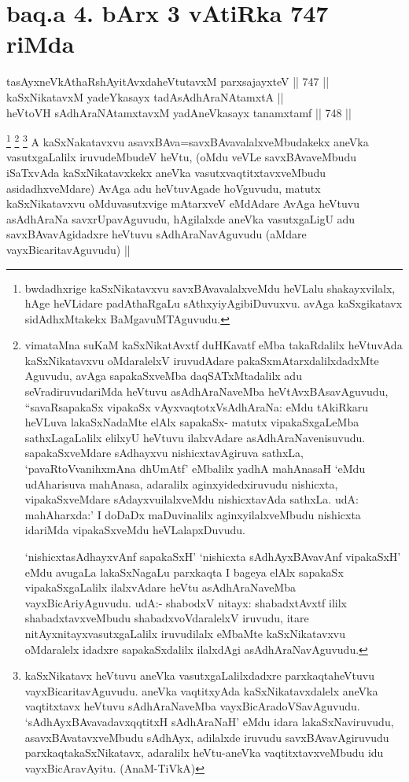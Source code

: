 \section*{baq.a 4. bArx 3 vAtiRka 747 riMda}

\begin{shl}
tasAyxneVkAthaRshAyitAvxdaheVtutavxM parxsajayxteV ||  747 || \\
kaSxNikatavxM yadeYkasayx tadA\s sAdhAraNAtamxtA || \\
heVtoVH sAdhAraNAtamxtavxM yadA\s neVkasayx tanamxtamf ||  748 ||  
\end{shl}

\begin{artha}
\footnote{bwdadhxrige kaSxNikatavxvu savxBAvavalalxveMdu heVLalu shakayxvilalx, hAge heVLidare padAthaRgaLu sAthxyiyAgibiDuvuxvu. avAga kaSxgikatavx sidAdhxMtakekx BaMgavuMTAguvudu.}
\footnote{vimataMna suKaM kaSxNikatAvxtf duHKavatf eMba takaRdalilx heVtuvAda kaSxNikatavxvu oMdaralelxV iruvudAdare pakaSxmAtarxdalilxdadxMte Aguvudu, avAga sapakaSxveMba daqSATxMtadalilx adu seVradiruvudariMda heVtuvu asAdhAraNaveMba heVtAvxBAsavAguvudu, ``savaRsapakaSx vipakaSx vAyxvaqtotxV\s sAdhAraNa: eMdu tAkiRkaru heVLuva lakaSxNadaMte elAlx sapakaSx- matutx vipakaSxgaLeMba sathxLagaLalilx elilxyU heVtuvu ilalxvAdare asAdhAraNavenisuvudu. sapakaSxveMdare sAdhayxvu nishicxtavAgiruva sathxLa, `pavaRtoVvanihxmAna dhUmAtf' eMbalilx yadhA mahAnasaH `eMdu udAharisuva mahAnasa, adaralilx aginxyidedxiruvudu nishicxta, vipakaSxveMdare sAdayxvuilalxveMdu nishicxtavAda sathxLa. udA: mahAharxda:' I doDaDx maDuvinalilx aginxyilalxveMbudu nishicxta idariMda vipakaSxveMdu heVLalapxDuvudu.

`nishicxtasAdhayxvAnf sapakaSxH' `nishicxta sAdhAyxBAvavAnf vipakaSxH' eMdu avugaLa lakaSxNagaLu parxkaqta I bageya elAlx sapakaSx vipakaSxgaLalilx ilalxvAdare heVtu asAdhAraNaveMba vayxBicAriyAguvudu. udA:- shabodxV nitayx: shabadxtAvxtf ililx shabadxtavxveMbudu shabadxvoVdaralelxV iruvudu, itare nitAyxnitayxvasutxgaLalilx iruvudilalx eMbaMte kaSxNikatavxvu oMdaralelx idadxre sapakaSxdalilx ilalxdAgi asAdhAraNavAguvudu.}
\footnote{kaSxNikatavx heVtuvu aneVka vasutxgaLalilxdadxre parxkaqtaheVtuvu vayxBicaritavAguvudu. aneVka vaqtitxyAda kaSxNikatavxdalelx aneVka vaqtitxtavx heVtuvu sAdhAraNaveMba vayxBicAradoVSavAguvudu. `sAdhAyxBAvavadavxqqtitxH sAdhAraNaH' eMdu idara lakaSxNaviruvudu, asavxBAvatavxveMbudu sAdhAyx, adilalxde iruvudu savxBAvavAgiruvudu parxkaqtakaSxNikatavx, adaralilx heVtu-aneVka vaqtitxtavxveMbudu idu vayxBicAravAyitu. (AnaM-TiVkA)}
A kaSxNakatavxvu asavxBAva=savxBAvavalalxveMbudakekx aneVka vasutxgaLalilx iruvudeMbudeV heVtu, (oMdu veVLe savxBAvaveMbudu iSaTxvAda kaSxNikatavxkekx aneVka vasutxvaqtitxtavxveMbudu asidadhxveMdare) AvAga adu heVtuvAgade hoVguvudu, matutx kaSxNikatavxvu oMduvasutxvige mAtarxveV eMdAdare AvAga heVtuvu asAdhAraNa savxrUpavAguvudu, hAgilalxde aneVka vasutxgaLigU adu savxBAvavAgidadxre heVtuvu sAdhAraNavAguvudu (aMdare vayxBicaritavAguvudu) ||
\end{artha}

